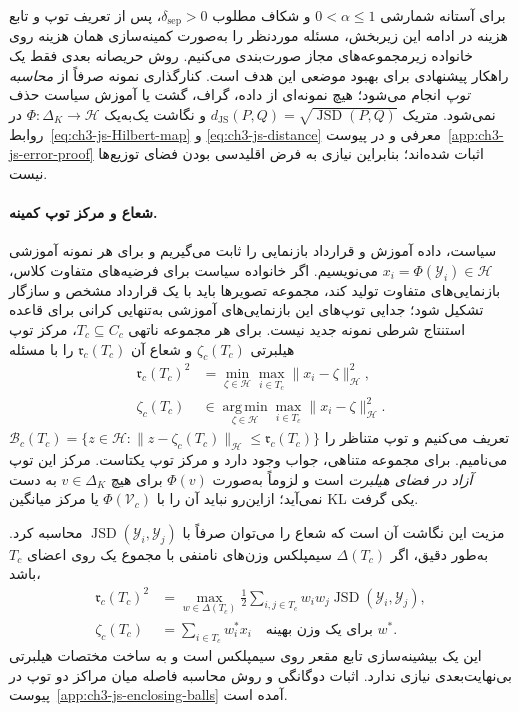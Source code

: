 برای آستانه شمارشی
$0<\alpha\le1$ و شکاف مطلوب
$\delta_{\mathrm{sep}}>0$،
پس از تعریف توپ و تابع هزینه
در ادامه این زیربخش، مسئله
موردنظر را به‌صورت کمینه‌سازی
همان هزینه روی خانواده
زیرمجموعه‌های مجاز صورت‌بندی
می‌کنیم. روش حریصانه بعدی
فقط یک راهکار پیشنهادی
برای بهبود موضعی این هدف است.
کنارگذاری نمونه صرفاً
از \emph{محاسبه توپ} انجام
می‌شود؛ هیچ نمونه‌ای از
داده، گراف، گشت یا آموزش
سیاست حذف نمی‌شود.
متریک
$d_{\mathrm{JS}}(P,Q)=\sqrt{\operatorname{JSD}(P,Q)}$
و نگاشت یک‌به‌یک
$\Phi:\Delta_K\to\mathcal H$
در روابط~\eqref{eq:ch3-js-Hilbert-map} و
\eqref{eq:ch3-js-distance} معرفی و
در پیوست~\ref{app:ch3-js-error-proof}
اثبات شده‌اند؛ بنابراین نیازی به
فرض اقلیدسی بودن فضای توزیع‌ها نیست.

\paragraph{شعاع و مرکز توپ کمینه.}
سیاست، داده آموزش و قرارداد بازنمایی را
ثابت می‌گیریم و برای هر نمونه آموزشی
$x_i=\Phi(\mathscr Y_i)\in\mathcal H$
می‌نویسیم. اگر خانواده سیاست برای
فرضیه‌های متفاوت کلاس، بازنمایی‌های
متفاوت تولید کند، مجموعه تصویرها باید
با یک قرارداد مشخص و سازگار تشکیل شود؛
جدایی توپ‌های این بازنمایی‌های آموزشی
به‌تنهایی کرانی برای قاعده استنتاج
شرطی نمونه جدید نیست. برای هر مجموعه ناتهی
$T_c\subseteq C_c$، مرکز توپ هیلبرتی
$\zeta_c(T_c)$ و شعاع آن
$\mathfrak r_c(T_c)$ را با مسئله
\begin{equation}\label{eq:ch3-outlier-js-meb-primal}
\boxed{
\begin{aligned}
\mathfrak r_c(T_c)^2
&=\min_{\zeta\in\mathcal H}
\max_{i\in T_c}\|x_i-\zeta\|_{\mathcal H}^2,\\
\zeta_c(T_c)
&\in\operatorname*{arg\,min}_{\zeta\in\mathcal H}
\max_{i\in T_c}\|x_i-\zeta\|_{\mathcal H}^2.
\end{aligned}}
\end{equation}
تعریف می‌کنیم و توپ متناظر را
$\mathcal B_c(T_c)=
\{z\in\mathcal H:
\|z-\zeta_c(T_c)\|_{\mathcal H}
\le\mathfrak r_c(T_c)\}$
می‌نامیم. برای مجموعه متناهی،
جواب وجود دارد و مرکز توپ یکتاست.
مرکز این توپ \emph{آزاد در فضای هیلبرت}
است و لزوماً به‌صورت
$\Phi(v)$ برای هیچ
$v\in\Delta_K$ به دست نمی‌آید؛
ازاین‌رو نباید آن را با
$\Phi(\mathcal V_c)$ یا مرکز
میانگین KL یکی گرفت.

مزیت این نگاشت آن است که شعاع
را می‌توان صرفاً با
$\operatorname{JSD}(\mathscr Y_i,\mathscr Y_j)$
محاسبه کرد. به‌طور دقیق، اگر
$\Delta(T_c)$ سیمپلکس وزن‌های
نامنفی با مجموع یک روی اعضای $T_c$ باشد،
\begin{equation}\label{eq:ch3-outlier-js-meb-dual}
\boxed{
\begin{aligned}
\mathfrak r_c(T_c)^2
&=\max_{w\in\Delta(T_c)}
\frac12\sum_{i,j\in T_c}w_iw_j
\operatorname{JSD}(\mathscr Y_i,\mathscr Y_j),\\
\zeta_c(T_c)
&=\sum_{i\in T_c}w_i^*x_i
\quad\text{برای یک وزن بهینه }w^*.
\end{aligned}}
\end{equation}
این یک بیشینه‌سازی تابع مقعر
روی سیمپلکس است و به ساخت
مختصات هیلبرتی بی‌نهایت‌بعدی
نیازی ندارد. اثبات دوگانگی و
روش محاسبه فاصله میان مراکز
دو توپ در
پیوست~\ref{app:ch3-js-enclosing-balls}
آمده است.

